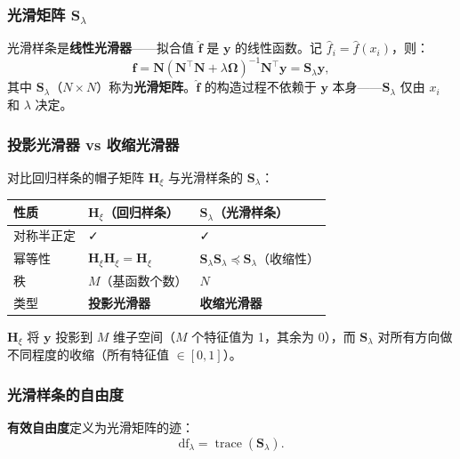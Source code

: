 \subsubsection{光滑矩阵 $\mathbf{S}_\lambda$}

光滑样条是\textbf{线性光滑器}——拟合值 $\hat{\mathbf{f}}$ 是 $\mathbf{y}$ 的线性函数。记 $\hat{f}_i = \hat{f}(x_i)$，则：
\begin{equation}\label{eq:smoother_matrix}
    \hat{\mathbf{f}} = \mathbf{N}(\mathbf{N}^\top\mathbf{N} + \lambda\boldsymbol{\Omega})^{-1} \mathbf{N}^\top \mathbf{y}
    = \mathbf{S}_\lambda \mathbf{y},
\end{equation}
其中 $\mathbf{S}_\lambda$（$N\times N$）称为\textbf{光滑矩阵}。$\hat{\mathbf{f}}$ 的构造过程不依赖于 $\mathbf{y}$ 本身——$\mathbf{S}_\lambda$ 仅由 $x_i$ 和 $\lambda$ 决定。

\subsubsection{投影光滑器 vs 收缩光滑器}

对比回归样条的帽子矩阵 $\mathbf{H}_\xi$ 与光滑样条的 $\mathbf{S}_\lambda$：

\begin{center}
\begin{tabular}{lll}
\toprule
性质 & $\mathbf{H}_\xi$（回归样条） & $\mathbf{S}_\lambda$（光滑样条） \\
\midrule
对称半正定 & ✓ & ✓ \\
幂等性 & $\mathbf{H}_\xi\mathbf{H}_\xi = \mathbf{H}_\xi$ & $\mathbf{S}_\lambda\mathbf{S}_\lambda \preceq \mathbf{S}_\lambda$（收缩性） \\
秩 & $M$（基函数个数） & $N$ \\
类型 & \textbf{投影光滑器} & \textbf{收缩光滑器} \\
\bottomrule
\end{tabular}
\end{center}

$\mathbf{H}_\xi$ 将 $\mathbf{y}$ 投影到 $M$ 维子空间（$M$ 个特征值为 1，其余为 0），而 $\mathbf{S}_\lambda$ 对所有方向做不同程度的收缩（所有特征值 $\in [0,1]$）。

\subsubsection{光滑样条的自由度}

\textbf{有效自由度}定义为光滑矩阵的迹：
\begin{equation}\label{eq:df_smoothing}
    \boxed{\mathrm{df}_\lambda = \operatorname{trace}(\mathbf{S}_\lambda).}
\end{equation}

